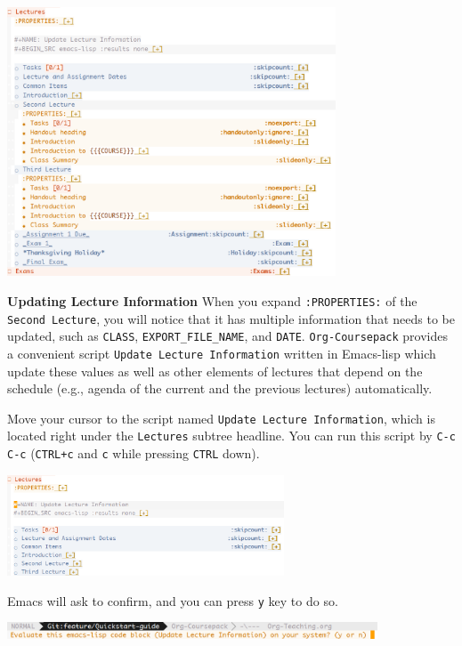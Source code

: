 \documentclass[10pt,article]{article}
\begin{document}
\begin{center}
\includegraphics[height=8cm]{../../../Assets/Images/Org-Teaching/Quickstart_Lectures-Second-Lecture.png}
\end{center}

\textbf{Updating Lecture Information} When you expand \texttt{:PROPERTIES:} of the \texttt{Second
Lecture}, you will notice that it has multiple information that needs to be
updated, such as \texttt{CLASS}, \texttt{EXPORT\_FILE\_NAME}, and \texttt{DATE}. \texttt{Org-Coursepack}
provides a convenient script \texttt{Update Lecture Information} written in
Emacs-lisp which update these values as well as other elements of lectures
that depend on the schedule (e.g., agenda of the current and the previous
lectures) automatically.

Move your cursor to the script named \texttt{Update Lecture Information}, which is
located right under the \texttt{Lectures} subtree headline. You can run this script
by \texttt{C-c C-c} (\texttt{CTRL+c} and \texttt{c} while pressing \texttt{CTRL} down). 

\begin{center}
\includegraphics[height=3cm]{../../../Assets/Images/Org-Teaching/Quickstart_Lectures-Run-Script-Update-Lectures.png}
\end{center}

Emacs will ask to confirm, and you can press \texttt{y} key to do so.

\begin{center}
\includegraphics[width=11cm]{../../../Assets/Images/Org-Teaching/Quickstart_Lectures-Run-Script-Update-Lectures-Confirm.png}
\end{center}
\end{document}
